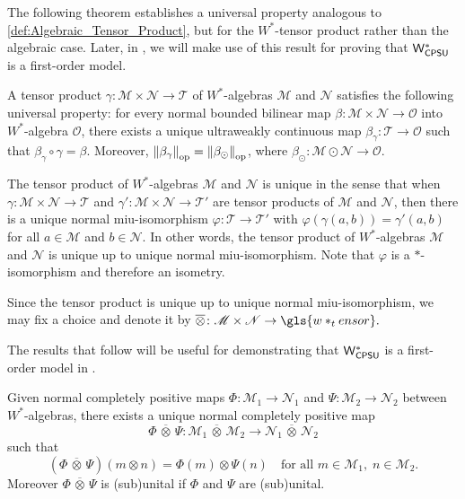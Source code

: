 The following theorem establishes a universal property analogous to \autoref{def:Algebraic_Tensor_Product}, but for the $W^*$-tensor product rather than the algebraic case. Later, in ,  we will make use of this result for proving that $\mathsf{W^*_{CPSU}}$ is a first-order model.

\begin{theorem} \cite[Theorem 112 XI]{westerbaanCategoryNeumannAlgebras2019} \label{thm:beta_alg_eq_beta_gamma}
A tensor product $\gamma\colon \mathscr{M} \times \mathscr{N} \to \mathscr{T}$ of $W^*$-algebras $\mathscr{M}$ and $\mathscr{N}$ satisfies the following universal property: for every normal bounded bilinear map $\beta\colon  \mathscr{M} \times  \mathscr{N} \to \mathscr{O}$ into $W^*$-algebra $\mathscr{O}$, there exists a unique ultraweakly continuous map $\beta_\gamma\colon \mathscr{T} \to \mathscr{O}$ such that $\beta_\gamma \circ \gamma = \beta$. Moreover, $ \left\lVert \beta_\gamma \right\rVert_{\text{op}} = \left\lVert \beta_\odot \right\rVert_{\text{op}}$, where $
\beta_\odot\colon  \mathscr{M} \odot  \mathscr{N} \to \mathscr{O}.
$
\end{theorem}

\begin{proposition} \cite[Exercise 114 II]{westerbaanCategoryNeumannAlgebras2019} \label{prop:tenso_w_unique}
   The tensor product of $W^*$-algebras $\mathscr{M}$ and $\mathscr{N}$ is unique in the sense that when $\gamma \colon \mathscr{M} \times \mathscr{N} \to \mathscr{T}$ and $\gamma' \colon \mathscr{M} \times \mathscr{N} \to \mathscr{T'}$ are tensor products of $\mathscr{M}$ and $\mathscr{N}$, then there is a unique normal miu-isomorphism $\varphi \colon \mathscr{T} \to \mathscr{T'}$ with $\varphi(\gamma(a,b)) = \gamma'(a,b)$ for all $a \in \mathscr{M}$ and $b \in \mathscr{N}$. In other words, the tensor product of $W^*$-algebras $\mathscr{M}$ and $\mathscr{N}$ is unique up to unique normal miu-isomorphism. Note that $\varphi$ is a $*$-isomorphism and therefore an isometry.
\end{proposition}

Since the tensor product is unique up to unique normal miu-isomorphism, we may fix a choice and denote it by 
$\overline{\otimes} \colon \mathscr{M} \times \mathscr{N} \to \gls{w*_tensor}.$

The results that follow will be useful for demonstrating that $\mathsf{W^*_{CPSU}}$ is a first-order model in .


\begin{proposition} \cite[Proposition 115 II]{westerbaanCategoryNeumannAlgebras2019} \label{prop:mapa_tensor_w_u_ncpsu}
Given normal completely positive  maps \( \Phi: \mathscr{M}_1 \to \mathscr{N}_1 \) and \( \Psi: \mathscr{M}_2 \to \mathscr{N}_2 \) between $W^*$-algebras, there exists a unique normal completely positive map
\[
\Phi\,\overline{\otimes} \, \Psi: \mathscr{M}_1 \,\overline{\otimes}\, \mathscr{M}_2 \to \mathscr{N}_1 \,\overline{\otimes}\, \mathscr{N}_2
\]
such that
\[
(\Phi \, \overline{\otimes} \, \Psi)(m \otimes n) = \Phi(m) \otimes\Psi(n)
\quad \text{for all } m \in \mathscr{M}_1,\; n \in \mathscr{M}_2.
\]
Moreover \(\Phi\, \overline{\otimes}\, \Psi\) is (sub)unital if \(\Phi\) and \(\Psi\) are (sub)unital.
\end{proposition}



